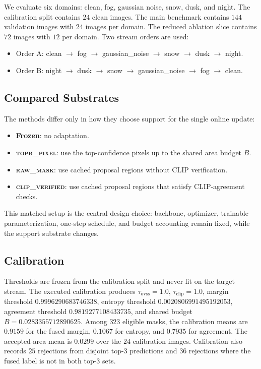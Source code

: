 \documentclass{article}
\newcommand{\method}{\textsc{clip\_verified}}
\newcommand{\topb}{\textsc{topb\_pixel}}
\newcommand{\rawmask}{\textsc{raw\_mask}}
\begin{document}
We evaluate six domains: clean, fog, gaussian noise, snow, dusk, and night. The calibration split contains $24$ clean images. The main benchmark contains $144$ validation images with $24$ images per domain. The reduced ablation slice contains $72$ images with $12$ per domain. Two stream orders are used:
\begin{itemize}[leftmargin=*,topsep=2pt,itemsep=2pt]
  \item Order A: clean $\rightarrow$ fog $\rightarrow$ gaussian\_noise $\rightarrow$ snow $\rightarrow$ dusk $\rightarrow$ night.
  \item Order B: night $\rightarrow$ dusk $\rightarrow$ snow $\rightarrow$ gaussian\_noise $\rightarrow$ fog $\rightarrow$ clean.
\end{itemize}

\subsection{Compared Substrates}
The methods differ only in how they choose support for the single online update:
\begin{itemize}[leftmargin=*,topsep=2pt,itemsep=2pt]
  \item \textbf{Frozen}: no adaptation.
  \item \textbf{\topb{}}: use the top-confidence pixels up to the shared area budget $B$.
  \item \textbf{\rawmask{}}: use cached proposal regions without CLIP verification.
  \item \textbf{\method{}}: use cached proposal regions that satisfy CLIP-agreement checks.
\end{itemize}

This matched setup is the central design choice: backbone, optimizer, trainable parameterization, one-step schedule, and budget accounting remain fixed, while the support substrate changes.

\subsection{Calibration}
Thresholds are frozen from the calibration split and never fit on the target stream. The executed calibration produces $\tau_{\text{ovss}}=1.0$, $\tau_{\text{clip}}=1.0$, margin threshold $0.9996290683746338$, entropy threshold $0.0020806991495192053$, agreement threshold $0.9819277108433735$, and shared budget $B=0.0283355712890625$. Among $323$ eligible masks, the calibration means are $0.9159$ for the fused margin, $0.1067$ for entropy, and $0.7935$ for agreement. The accepted-area mean is $0.0299$ over the $24$ calibration images. Calibration also records $25$ rejections from disjoint top-3 predictions and $36$ rejections where the fused label is not in both top-3 sets.
\end{document}
